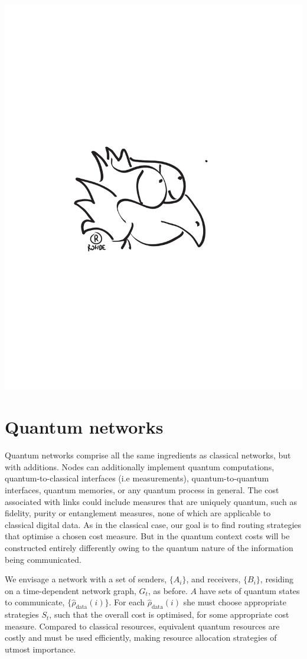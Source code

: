 \documentclass[aps, rmp, twocolumn, amsmath, amssymb, nofootinbib, superscriptaddress, longbibliography, floatfix, table-of-contents, eqsecnum]{revtex4-1}
\begin{document}
\begin{center}
	\includegraphics[width=0.6\columnwidth]{sketch_5}
\end{center}

%
%

\section{Quantum networks} \label{sec:quant_net} 

Quantum networks comprise all the same ingredients as classical networks, but with additions. Nodes can additionally implement quantum computations, quantum-to-classical interfaces (i.e measurements), quantum-to-quantum interfaces, quantum memories, or any quantum process in general. The cost associated with links could include measures that are uniquely quantum, such as fidelity, purity or entanglement measures, none of which are applicable to classical digital data. As in the classical case, our goal is to find routing strategies that optimise a chosen cost measure. But in the quantum context costs will be constructed entirely differently owing to the quantum nature of the information being communicated.

We envisage a network with a set of senders, $\{A_i\}$, and receivers, $\{B_i\}$, residing on a time-dependent network graph, $G_t$, as before. $A$ have sets of quantum states to communicate, $\{\hat\rho_\text{data}(i)\}$. For each $\hat\rho_\text{data}(i)$ she must choose appropriate strategies $S_t$, such that the overall cost is optimised, for some appropriate cost measure. Compared to classical resources, equivalent quantum resources are costly and must be used efficiently, making resource allocation strategies of utmost importance.
\end{document}
